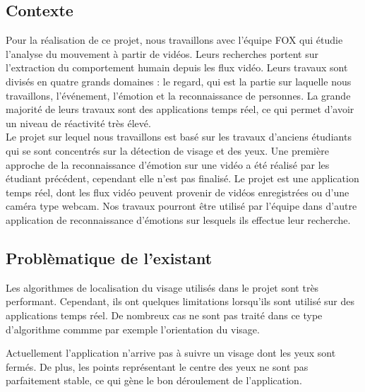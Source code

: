 \subsection{Contexte}
Pour la réalisation de ce projet, nous travaillons avec l'équipe FOX qui étudie
l'analyse du mouvement à partir de vidéos. Leurs recherches portent
sur l'extraction du comportement humain depuis les flux vidéo.  Leurs travaux sont
divisés en quatre grands domaines : le regard, qui est la partie sur laquelle nous travaillons, l'événement, l'émotion et la
reconnaissance de personnes. La grande majorité de leurs travaux sont
des applications temps réel, ce qui permet d'avoir un niveau de réactivité très élevé.\\ 

Le projet sur lequel nous travaillons est basé sur les travaux d'anciens étudiants qui se sont concentrés sur la
détection de visage et des yeux. Une première approche de la reconnaissance d'émotion sur une vidéo a été 
réalisé par les étudiant précédent, cependant elle n'est pas finalisé. Le projet est une application temps réel, dont les flux vidéo peuvent 
provenir de vidéos enregistrées ou d'une caméra type webcam. Nos travaux pourront être utilisé par
l'équipe dans d'autre application de reconnaissance d'émotions sur lesquels ils effectue leur recherche.\\

\subsection{Problèmatique de l'existant}
Les algorithmes de localisation du visage utilisés dans le projet sont très performant. Cependant,
ils ont quelques limitations lorsqu'ils sont utilisé sur des applications temps réel. De nombreux cas ne sont
pas traité dans ce type d'algorithme commme par exemple l'orientation du visage.

Actuellement l'application n'arrive pas à suivre un visage dont les yeux sont fermés. De plus, les points représentant
le centre des yeux ne sont pas parfaitement stable, ce qui gène le bon déroulement de l'application.

